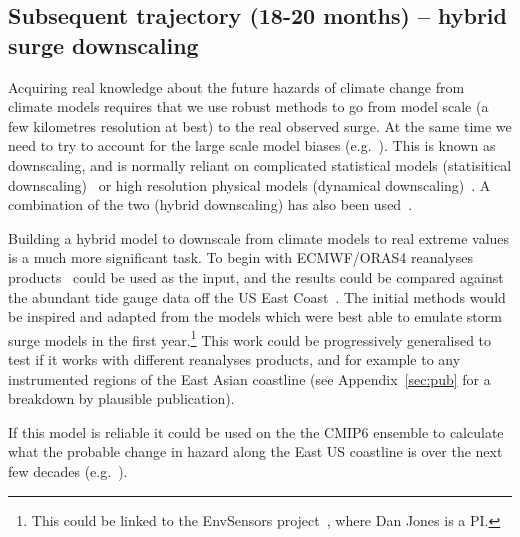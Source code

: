 \documentclass[usenames, dvipsnames]{article}      %
\begin{document}
\subsection*{\vspace{-5pt} Subsequent trajectory (18-20 months) -- hybrid surge downscaling}

Acquiring real knowledge about the future hazards of climate change
from climate models requires that we use robust methods to go from
model scale (a few kilometres resolution at best) to the real observed
surge. At the same time we need to try to account for the 
large scale model biases (e.g.~\cite{seager2019strengthening}).
This is known as downscaling, and is normally reliant on 
complicated statistical models (statisitical
downscaling)~\cite{Sithara2021StatisticalApproaches}
or high resolution physical models (dynamical
downscaling)~\cite{Barnard2019DynamicChange, Muis2020AProjections,
Dieterich2019ExtremeSensitivity, Troselj2021DynamicalJapan}.
A combination of the two (hybrid downscaling) has also been
used~\cite{Erlandsen2020AChange, Huang2014DownscalingApproach}.


Building a hybrid model to downscale from climate models 
to real extreme values is a much more significant task.
To begin with ECMWF/ORAS4 reanalyses
products~\cite{Zuo2019TheAssessment,Zuo2017TheSignals, OceanECMWF}
could be used as the input, and the results 
could be compared against the abundant
tide gauge data off the US East Coast~\cite{CO-OPSCurrents}.
The initial methods would be inspired and adapted 
from the models which were best able to emulate storm surge models in the 
first year.\footnote{This could be linked to the EnvSensors project~\cite{EnvironmentalInstitute}, where Dan Jones is a PI.}
This work could be progressively generalised to test if it works with 
different reanalyses products, and for example to any instrumented regions
of the East Asian coastline (see Appendix~\ref{sec:pub} for a breakdown by 
plausible publication).

If this model is reliable it could be used on the the CMIP6 ensemble
to calculate what the probable change in hazard along the East US coastline 
is over the next few decades (e.g.~\cite{Rahmstorf2017RisingFlooding}).


\printbibliography

\appendix

\end{document}
